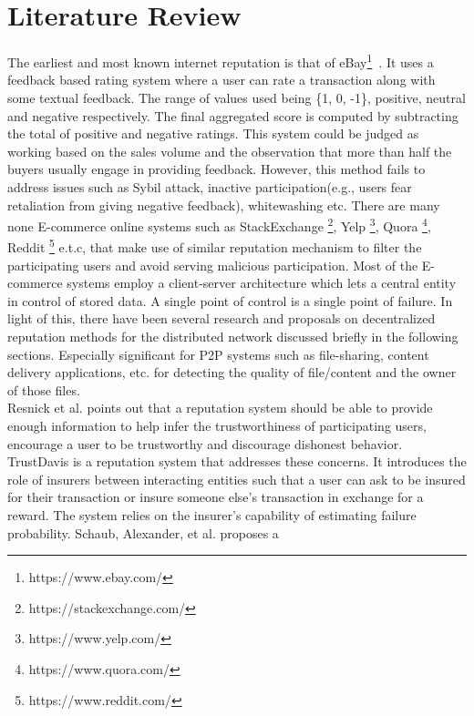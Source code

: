 \chapter{Literature Review}\label{ch:litrev}
The earliest and most known internet reputation is that of
eBay\footnote{https://www.ebay.com/}~\cite{resnick2002trust}. It uses a
feedback based rating system where a user can rate a transaction along with
some textual feedback. The range of values used being \{1, 0, -1\}, positive,
neutral and negative respectively.  The final aggregated score is computed by
subtracting the total of positive and negative ratings. This system
\cite{resnick2002trust} \cite{resnick2006value} could be judged as working
based on the sales volume and the observation that more than half the buyers
usually engage in providing feedback. However, this method fails to address
issues such as Sybil attack, inactive participation(e.g., users fear
retaliation from giving negative feedback), whitewashing etc. There are many
none E-commerce online systems such as StackExchange
\footnote{https://stackexchange.com/}, Yelp \footnote{https://www.yelp.com/},
Quora \footnote{https://www.quora.com/}, Reddit
\footnote{https://www.reddit.com/} e.t.c, that make use of similar reputation
mechanism to filter the participating users and avoid serving malicious
participation. Most of the E-commerce systems employ a client-server
architecture which lets a central entity in control of stored data.  A single
point of control is a single point of failure. In light of this, there have
been several research and proposals on decentralized reputation methods for the
distributed network discussed briefly in the following sections. Especially
significant for P2P systems such as file-sharing, content delivery
applications, etc. for detecting the quality of file/content and the owner of
those files.\\
Resnick et al. \cite{resnick2000reputation}points out that a reputation system
should be able to provide enough information to help infer the trustworthiness
of participating users, encourage a user to be trustworthy and discourage
dishonest behavior. TrustDavis \cite{defigueiredo2005trustdavis} is a
reputation system that addresses these concerns. It introduces the role of
insurers between interacting entities such that a user can ask to be insured
for their transaction or insure someone else's transaction in exchange for a
reward. The system relies on the insurer's capability of estimating failure
probability. Schaub, Alexander, et al. \cite{schaub2016trustless} proposes a
